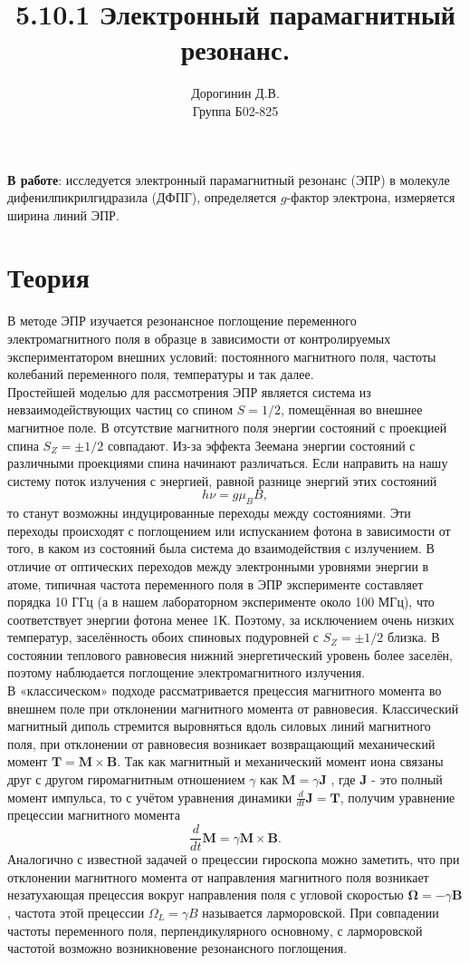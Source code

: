 \documentclass[a4paper,12pt]{article}
\author{Дорогинин Д.В.\\
Группа Б02-825}
\title{5.10.1 Электронный парамагнитный резонанс.}
\date{}
\begin{document}
\maketitle
\textbf{В работе}: исследуется электронный парамагнитный резонанс (ЭПР) в молекуле дифенилпикрилгидразила (ДФПГ), определяется $g$-фактор электрона, измеряется ширина линий ЭПР.
\section*{Теория}
В методе ЭПР изучается резонансное поглощение переменного электромагнитного поля в образце в зависимости от контролируемых экспериментатором внешних условий: постоянного магнитного поля, частоты колебаний переменного поля, температуры и так далее. \\
Простейшей моделью для рассмотрения ЭПР является система из невзаимодействующих
частиц со спином $S = 1/2$, помещённая во внешнее магнитное поле. В отсутствие
магнитного поля энергии состояний с проекцией спина $S_Z = \pm 1/2$ совпадают. Из-за эффекта Зеемана энергии состояний с различными проекциями спина начинают различаться. Если направить на нашу систему поток излучения с энергией, равной разнице энергий этих состояний 
\begin{equation}\label{2}
h \nu = g\mu_B B,
\end{equation} 
то станут возможны индуцированные переходы между состояниями. Эти переходы происходят с поглощением или испусканием фотона в зависимости от того, в каком из состояний была система до взаимодействия с излучением. В отличие от оптических переходов между электронными уровнями энергии в атоме, типичная частота переменного поля в ЭПР эксперименте составляет порядка 10 ГГц (а в нашем лабораторном эксперименте около 100 МГц), что соответствует энергии фотона менее 1К. Поэтому, за исключением очень низких температур, заселённость обоих спиновых подуровней с $S_Z = \pm 1/2$ близка. В состоянии теплового равновесия нижний энергетический уровень более заселён, поэтому наблюдается поглощение электромагнитного излучения. \\
В «классическом» подходе рассматривается прецессия магнитного момента во внешнем поле при отклонении магнитного момента от равновесия. Классический магнитный диполь стремится выровняться вдоль силовых линий магнитного поля, при отклонении от равновесия возникает возвращающий механический момент $\mathbf{T} = \mathbf{M}\times \mathbf{B}$. Так как магнитный и механический момент иона связаны друг с другом гиромагнитным отношением $\gamma$ как $\mathbf{M}=\gamma \mathbf{J}$ , где $\mathbf{J}$ - это полный момент импульса, то с учётом уравнения динамики
$\frac{d}{dt}\mathbf{J} = \mathbf{T}$, получим уравнение прецессии магнитного момента
\[\dfrac{d}{dt}\mathbf{M} = \gamma \mathbf{M} \times \mathbf{B}.\] 
Аналогично
с известной задачей о прецессии гироскопа можно заметить, что при отклонении магнитного момента от направления магнитного поля возникает незатухающая прецессия вокруг направления поля с угловой скоростью $\boldsymbol{\Omega} = -\gamma \mathbf{B}$, частота этой прецессии $\Omega_L = \gamma B$ называется ларморовской. При совпадении частоты переменного поля, перпендикулярного основному, с ларморовской частотой возможно возникновение резонансного поглощения.
\end{document}

